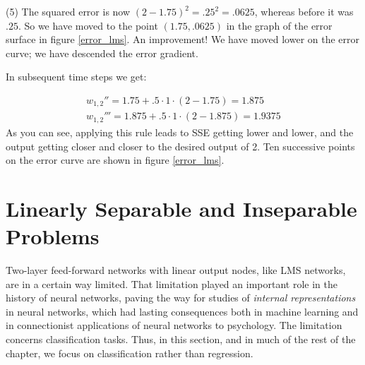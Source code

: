 (5) The squared error is now $(2-1.75)^2=.25^2=.0625$, whereas before it was $.25$. So we have moved to the point $(1.75,.0625)$ in the graph  of the error surface in figure \ref{error_lms}. An improvement!  We have moved lower on the error curve; we have descended the error gradient.

In subsequent time steps we get:

\begin{align*}
w_{1,2}'' = 1.75 + .5 \cdot 1 \cdot (2 - 1.75) = 1.875 \\
w_{1,2}''' = 1.875 + .5 \cdot 1 \cdot (2 - 1.875) = 1.9375
\end{align*}
As you can see, applying this rule leads to SSE getting lower and lower, and the output getting closer and closer to the desired output of 2. Ten successive points on the error curve are shown in figure \ref{error_lms}.

\section{Linearly Separable and Inseparable Problems}
\label{linearlySeparable}


Two-layer feed-forward networks with linear output nodes, like LMS networks, are in a certain way limited. That limitation played an important role in the history of neural networks, paving the way for studies of \emph{internal representations} in neural networks, which had lasting consequences both in machine learning and in connectionist applications of neural networks to psychology. The limitation concerns  classification tasks. Thus, in this section, and in much of the rest of the chapter, we focus on classification rather than regression.

